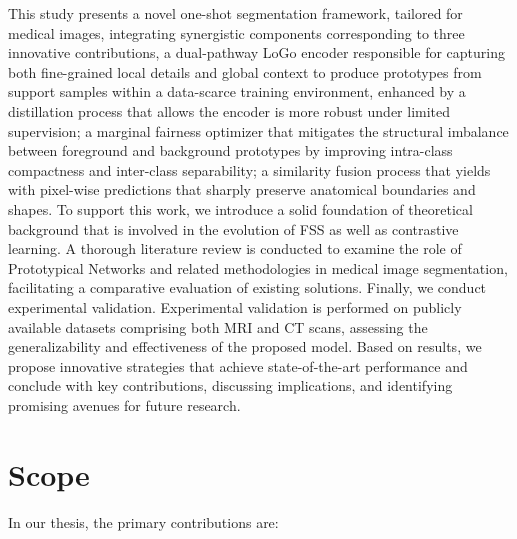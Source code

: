 This study presents a novel one-shot segmentation framework, tailored for medical images, integrating synergistic components corresponding to three innovative contributions, a dual-pathway LoGo encoder responsible for capturing both fine-grained local details and global context to produce prototypes from support samples within a data-scarce training environment, enhanced by a distillation process that allows the encoder is more robust under limited supervision; a marginal fairness optimizer that mitigates the structural imbalance between foreground and background prototypes by improving intra-class compactness and inter-class separability; a similarity fusion process that yields with pixel-wise predictions that sharply preserve anatomical boundaries and shapes. To support this work, we introduce a solid foundation of theoretical background that is involved in the evolution of FSS as well as contrastive learning. A thorough literature review is conducted to examine the role of Prototypical Networks and related methodologies in medical image segmentation, facilitating a comparative evaluation of existing solutions. Finally, we conduct experimental validation. Experimental validation is performed on publicly available datasets comprising both MRI and CT scans, assessing the generalizability and effectiveness of the proposed model. Based on results, we propose innovative strategies that achieve state-of-the-art performance and conclude with key contributions, discussing implications, and identifying promising avenues for future research.

\newpage

\section{Scope}
\label{sec:intro-scope}

In our thesis, the primary contributions are:

